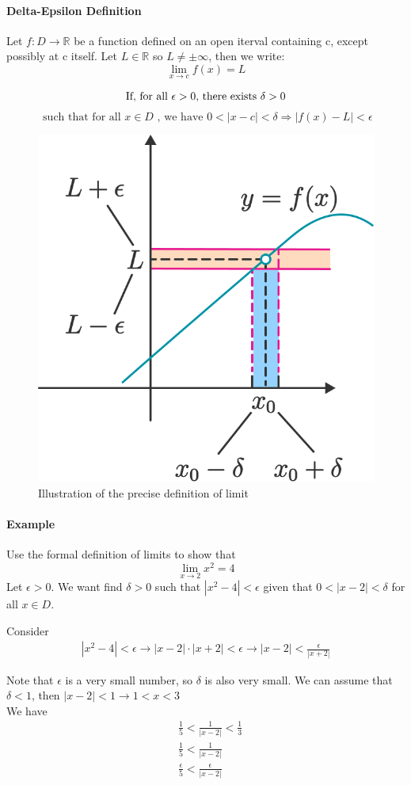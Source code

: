 \documentclass[12pt]{article}
\begin{document}
\paragraph{Delta-Epsilon Definition} Let $f : D \rightarrow \mathbb{R}$ be a function defined on an open iterval 
containing c, except possibly  at c itself.
Let $L \in \mathbb{R}$ so $L \neq \pm \infty$, then we write:
\[
    \lim_{x \to c} f(x) = L
\]

\[
    \textrm{If, for all } \epsilon > 0 \textrm{, there exists } \delta > 0 \\
\]
\[
    \textrm{ such that for all } x \in D \textrm{ , we have } 0 < |x-c| < \delta \Rightarrow |f(x) - L| < \epsilon
\]

\begin{figure} 
    \centering
    \includegraphics[width=0.4\linewidth]{images/limit_def.png}
    \caption{Illustration of the precise definition of limit}
\end{figure}

\paragraph{Example} Use the formal definition of limits to show that 
\[
    \lim_{x \to 2} x^2 = 4
\]
Let $\epsilon > 0$. We want find $\delta > 0$ such that $|x^2 - 4| < \epsilon$ 
given that $0 < |x-2| < \delta$ for all $x \in D$.

\noindent
Consider 
\begin{align*} 
    |x^2 - 4| < \epsilon \rightarrow |x - 2|\cdot|x + 2| < \epsilon \rightarrow |x - 2| < \frac{\epsilon}{|x + 2|} 
\end{align*}

\noindent
Note that $\epsilon$ is a very small number, so $\delta$ is also very small. We can assume that 
$\delta < 1$, then $|x - 2| < 1 \rightarrow 1 < x < 3$\\
We have
\begin{align*} 
    & \frac{1}{5} < \frac{1}{|x - 2|} < \frac{1}{3} \\
    & \frac{1}{5} < \frac{1}{|x - 2|} \\
    & \frac{\epsilon}{5} < \frac{\epsilon}{|x - 2|} 
\end{align*} 
\end{document}
